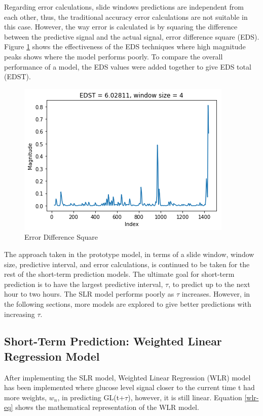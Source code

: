 Regarding error calculations, slide windows predictions are independent from each other, thus, the traditional accuracy error calculations are not suitable in this case. However, the way error is calculated is by squaring the difference between the predictive signal and the actual signal, error difference square (EDS). Figure \ref{lr-eds-fig} shows the effectiveness of the EDS techniques where high magnitude peaks shows where the model performs poorly. To compare the overall performance of a model, the EDS values were added together to give EDS total (EDST).  

\begin{center}
\begin{figure}[ht!]
	\centering
    \includegraphics[width=\textwidth]{Figures/mo/lr-eds.png}
 	\caption{Error Difference Square}
  	\label{lr-eds-fig}
\end{figure}
\end{center}

\bigbreak

The approach taken in the prototype model, in terms of a slide window, window size, predictive interval, and error calculations, is continued to be taken for the rest of the short-term prediction models. The ultimate goal for short-term prediction is to have the largest predictive interval, \ensuremath{\tau}, to predict up to the next hour to two hours. The SLR model performs poorly as \ensuremath{\tau} increases. However, in the following sections, more models are explored to give better predictions with increasing \ensuremath{\tau}.

\subsection{Short-Term Prediction: Weighted Linear Regression Model}
After implementing the SLR model, Weighted Linear Regression (WLR) model has been implemented where glucose level signal closer to the current time t had more weights, \ensuremath{w_n}, in predicting GL(t+\ensuremath{\tau}), however, it is still linear. Equation \ref{wlr-eq} shows the mathematical representation of the WLR model.

